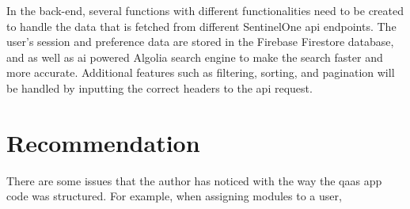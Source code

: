 In the back-end, several functions with different functionalities need to be created to handle the data that is fetched from different SentinelOne
\acrshort{api} endpoints. The user's session and preference data are stored in the Firebase Firestore database, and as well as \acrshort{ai} powered
Algolia search engine to make the search faster and more accurate. Additional features such as filtering, sorting, and pagination will be handled by
inputting the correct headers to the \acrshort{api} request.

\section{Recommendation}

There are some issues that the author has noticed with the way the \acrshort{qaas} app code was structured. For example, when
assigning modules to a user,


